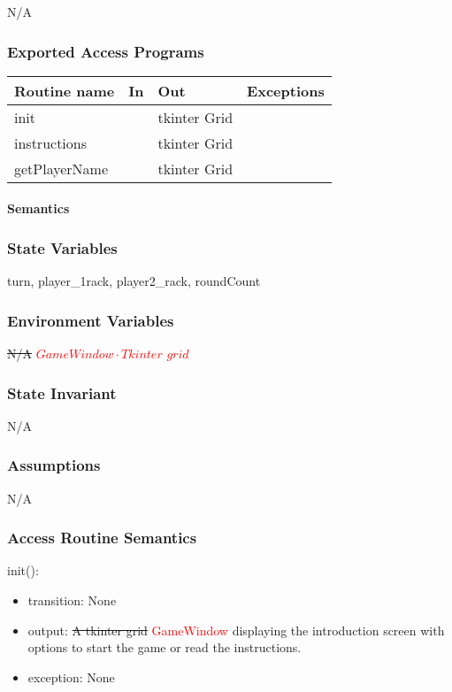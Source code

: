\documentclass[12pt]{article}
\begin{document}
N/A

\subsubsection* {Exported Access Programs}

\begin{tabular}{| l | l | l | l |}
\hline
\textbf{Routine name} & \textbf{In} & \textbf{Out} & \textbf{Exceptions}\\
\hline
init & & tkinter Grid & \\
\hline
instructions & & tkinter Grid & \\
\hline
getPlayerName & & tkinter Grid & \\
\hline
\end{tabular}

\paragraph* {Semantics}

\subsubsection*{State Variables}

turn, player\_1rack, player2\_rack, roundCount

\subsubsection*{Environment Variables}

\sout{N/A} \textcolor{red}{$GameWindow \cdot Tkinter$  $grid$}

\subsubsection*{State Invariant}

N/A

\subsubsection*{Assumptions}

N/A

\subsubsection* {Access Routine Semantics}

\noindent init():
\begin{itemize}
\item transition: None
\item output: \sout{A tkinter grid} \textcolor{red}{GameWindow} displaying the introduction screen with options to start the game or read the instructions.
\item exception: None
\end{itemize}
\end{document}
